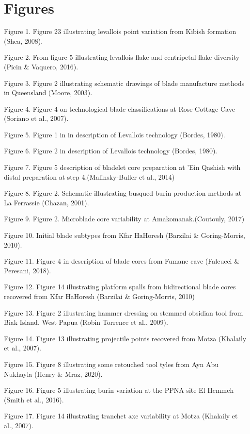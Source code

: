 \documentclass[
]{article}
\begin{document}
\hypertarget{figures}{%
\section{Figures}\label{figures}}

Figure 1. Figure 23 illustrating levallois point variation from Kibish
formation (Shea, 2008).

Figure 2. From figure 5 illustrating levallois flake and centripetal
flake diversity (Picin \& Vaquero, 2016).

Figure 3. Figure 2 illustrating schematic drawings of blade manufacture
methods in Queensland (Moore, 2003).

Figure 4. Figure 4 on technological blade classifications at Rose
Cottage Cave (Soriano et al., 2007).

Figure 5. Figure 1 in in description of Levallois technology (Bordes,
1980).

Figure 6. Figure 2 in description of Levallois technology (Bordes,
1980).

Figure 7. Figure 5 description of bladelet core preparation at 'Ein
Qashish with distal preparation at step 4.(Malinsky-Buller et al., 2014)

Figure 8. Figure 2. Schematic illustrating busqued burin production
methods at La Ferrassie (Chazan, 2001).

Figure 9. Figure 2. Microblade core variability at Amakomanak.(Coutouly,
2017)

Figure 10. Initial blade subtypes from Kfar HaHoresh (Barzilai \&
Goring-Morris, 2010).

Figure 11. Figure 4 in description of blade cores from Fumane cave
(Falcucci \& Peresani, 2018).

Figure 12. Figure 14 illustrating platform spalls from bidirectional
blade cores recovered from Kfar HaHoresh (Barzilai \& Goring-Morris,
2010)

Figure 13. Figure 2 illustrating hammer dressing on stemmed obsidian
tool from Biak Island, West Papua (Robin Torrence et al., 2009).

Figure 14. Figure 13 illustrating projectile points recovered from Motza
(Khalaily et al., 2007).

Figure 15. Figure 8 illustrating some retouched tool tyles from Ayn Abu
Nukhayla (Henry \& Mraz, 2020).

Figure 16. Figure 5 illustrating burin variation at the PPNA site El
Hemmeh (Smith et al., 2016).

Figure 17. Figure 14 illustrating tranchet axe variability at Motza
(Khalaily et al., 2007).
\end{document}
